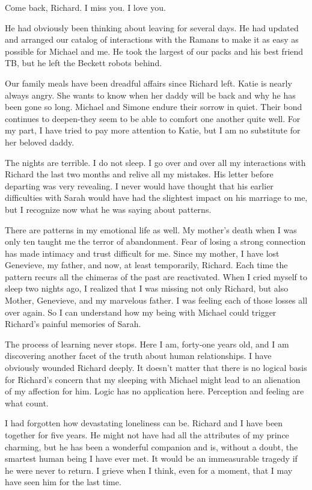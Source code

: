 \documentclass[]{article}
\begin{document}
Come back, Richard. I miss you. I love you.

He had obviously been thinking about leaving for several days. He had updated and arranged our catalog of interactions with the Ramans to make it as easy as possible for Michael and me. He took the largest of our packs and his best friend TB, but he left the Beckett robots behind.

Our family meals have been dreadful affairs since Richard left. Katie is nearly always angry. She wants to know when her daddy will be back and why he has been gone so long. Michael and Simone endure their sorrow in quiet. Their bond continues to deepen-they seem to be able to comfort one another quite well. For my part, I have tried to pay more attention to Katie, but I am no substitute for her beloved daddy.

The nights are terrible. I do not sleep. I go over and over all my interactions with Richard the last two months and relive all my mistakes. His letter before departing was very revealing. I never would have thought that his earlier difficulties with Sarah would have had the slightest impact on his marriage to me, but I recognize now what he was saying about patterns.

There are patterns in my emotional life as well. My mother’s death when I was only ten taught me the terror of abandonment. Fear of losing a strong connection has made intimacy and trust difficult for me. Since my mother, I have lost Genevieve, my father, and now, at least temporarily, Richard. Each time the pattern recurs all the chimeras of the past are reactivated. When I cried myself to sleep two nights ago, I realized that I was missing not only Richard, but also Mother, Genevieve, and my marvelous father. I was feeling each of those losses all over again. So I can understand how my being with Michael could trigger Richard’s painful memories of Sarah.

The process of learning never stops. Here I am, forty-one years old, and I am discovering another facet of the truth about human relationships. I have obviously wounded Richard deeply. It doesn’t matter that there is no logical basis for Richard’s concern that my sleeping with Michael might lead to an alienation of my affection for him. Logic has no application here. Perception and feeling are what count.

I had forgotten how devastating loneliness can be. Richard and I have been together for five years. He might not have had all the attributes of my prince charming, but he has been a wonderful companion and is, without a doubt, the smartest human being I have ever met. It would be an immeasurable tragedy if he were never to return. I grieve when I think, even for a moment, that I may have seen him for the last time.
\end{document}
